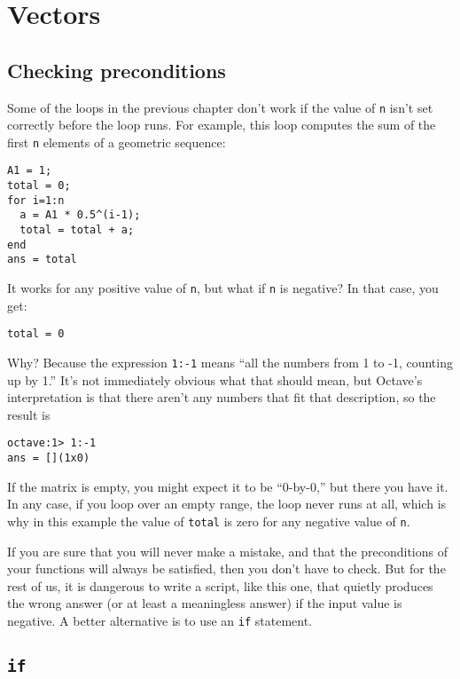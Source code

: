 
\chapter{Vectors}
\label{vectors}

\section{Checking preconditions}

Some of the loops in the previous chapter don't work
if the value of {\tt n} isn't set correctly before the loop runs.
For example, this loop computes the sum of the first {\tt n} elements
of a geometric sequence:

\begin{verbatim}
A1 = 1;
total = 0;
for i=1:n
  a = A1 * 0.5^(i-1);
  total = total + a;
end
ans = total
\end{verbatim}

It works for any positive value of {\tt n}, but what if {\tt n}
is negative? In that case, you get:

\begin{verbatim}
total = 0
\end{verbatim}

Why? Because the expression {\tt 1:-1} means ``all the numbers
from 1 to -1, counting up by 1.'' It's not immediately obvious
what that should mean, but Octave's interpretation is that there
aren't any numbers that fit that description, so the result is

\begin{verbatim}
octave:1> 1:-1
ans = [](1x0)
\end{verbatim}

If the matrix is empty, you might expect it to be ``0-by-0,'' but
there you have it. In any case, if you loop over an empty range,
the loop never runs at all, which is why in this example the
value of {\tt total} is zero for any negative value of {\tt n}.

If you are sure that you will never make a mistake, and that the
preconditions of your functions will always be satisfied, then you
don't have to check. But for the rest of us, it is dangerous to write
a script, like this one, that quietly produces the wrong answer (or
at least a meaningless answer) if the input value is negative.
A better alternative is to use an {\tt if} statement.


\section{{\tt if}}

